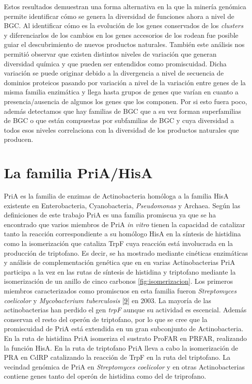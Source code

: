 \documentclass[12pt,twoside]{reedthesis}
\begin{document}
  Estos resultados demuestran una forma alternativa en la que la minería
  genómica permite identificar cómo se genera la diversidad de funciones
  ahora a nivel de BGC. Al identificar cómo es la evolución de los genes
  conservados de los \emph{clusters} y diferenciarlos de los cambios en
  los genes accesorios de los rodean fue posible guiar el descubrimiento
  de nuevos productos naturales. También este análisis nos permitió
  observar que existen distintos niveles de variación que generan
  diversidad química y que pueden ser entendidos como promiscuidad. Dicha
  variación se puede originar debido a la divergencia a nivel de secuencia
  de dominios proteicos pasando por variación a nivel de la variación
  entre genes de la misma familia enzimática y llega hasta grupos de genes
  que varían en cuanto a presencia/ausencia de algunos los genes que los
  componen. Por si esto fuera poco, además detectamos que hay familias de
  BGC que a su vez forman superfamilias de BGC o que están compuestas por
  subfamilias de BGC y cuya diversidad a todos esos niveles correlaciona
  con la diversidad de los productos naturales que producen.
  
  \chapter{La familia PriA/HisA}\label{la-familia-priahisa}
  
  PriA es la familia de enzimas de Actinobacteria homóloga a la familia
  HisA existente en Enterobacteria, Cyanobacteria, \emph{Pseudomonas} y
  Archaea. Según las definiciones de este trabajo PriA es una familia
  promiscua ya que se ha encontrado que varios miembros de PriA \emph{in
  vitro} tienen la capacidad de catalizar tanto la reacción
  correspondiente a su homólogo HisA en la síntesis de histidina como la
  isomerización que cataliza TrpF cuya reacción está involucrada en la
  producción de triptofano. Es decir, se ha mostrado mediante cinéticas
  enzimáticas y análisis de complementación genética que en en varias
  Actinobacterias PriA participa a la vez en las rutas de síntesis de
  histidina y triptofano mediante la isomerización de un anillo de cinco
  carbonos \autoref{fig:isomerizacion}. Los primeros miembros
  caracterizados como promiscuos en esta familia fueron \emph{Streptomyces
  coelicolor} y \emph{Mycobacterium tuberculosis}
  {[}\protect\hyperlink{ref-baronagomez_occurrence_2003}{9}{]} en 2003. La
  mayoría de las actinobacterias han perdido el gen \emph{trpF} aunque su
  actividad es escencial. Además conservan el resto del operón de
  triptofano, por lo que se cree que la promiscuidad de PriA está
  extendida en un gran subconjunto de Actinobacteria. En la ruta de
  histidina PriA isomeriza el sustrato ProFAR en PRFAR, realizando la
  función HisA. En la ruta de triptofano PriA lleva a cabo la
  isomerización de PRA en CdRP catalizando la reacción de TrpF en la ruta
  del triptofano. La vecindad genómica de PriA en \emph{Streptomyces
  coelicolor} y en otras Actinobacterias contiene genes tanto del operón
  de histidina como del de triprofano.
  
\end{document}
